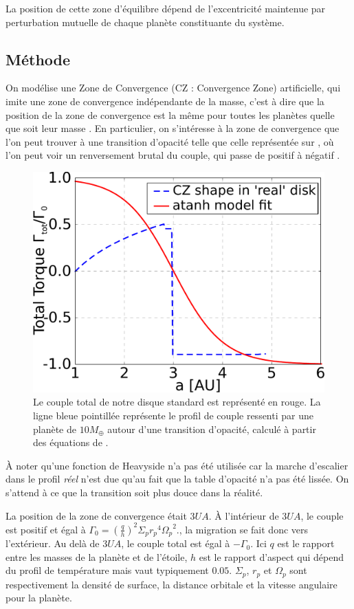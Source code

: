 La position de cette zone d'équilibre dépend de l'excentricité maintenue par perturbation mutuelle de chaque planète constituante du système.

\subsection{Méthode}
On modélise une Zone de Convergence (CZ : Convergence Zone) artificielle, qui imite une zone de convergence indépendante de la masse, c'est à dire que la position de la zone de convergence est la même pour toutes les planètes quelle que soit leur masse . En particulier, on s'intéresse à la zone de convergence que l'on peut trouver à une transition d'opacité telle que celle représentée sur , où l'on peut voir un renversement brutal du couple, qui passe de positif à négatif \citep[voir par exemple ][]{masset2011type}.

\begin{figure}[htb]
\centering
\includegraphics[width=0.49\linewidth]{figure/shifted/torque_zoom_CZ1.pdf}
\caption{Le couple total de notre disque standard est représenté en rouge. La ligne bleue pointillée représente le profil de couple ressenti par une planète de $10\unit{M_\oplus}$ autour d'une transition d'opacité, calculé à partir des équations de \cite{paardekooper2011torque}.}\label{fig:shifted_CZ_torque_prof}
\end{figure}

À noter qu'une fonction de Heavyside n'a pas été utilisée car la marche d'escalier dans le profil \textit{réel} n'est due qu'au fait que la table d'opacité n'a pas été lissée. On s'attend à ce que la transition soit plus douce dans la réalité.

La position de la zone de convergence était $3\unit{UA}$. À l'intérieur de $3\unit{UA}$, le couple est positif et égal à $\Gamma_0 = \left(\frac{q}{h}\right)^2\Sigma_p {r_p}^4 {\Omega_p}^2$., la migration se fait donc vers l'extérieur. Au delà de $3\unit{UA}$, le couple total est égal à $-\Gamma_0$. Ici $q$ est le rapport entre les masses de la planète et de l'étoile, $h$ est le rapport d'aspect qui dépend du profil de température mais vaut typiquement $0.05$. $\Sigma_p$, $r_p$ et $\Omega_p$ sont respectivement la densité de surface, la distance orbitale et la vitesse angulaire pour la planète. 

